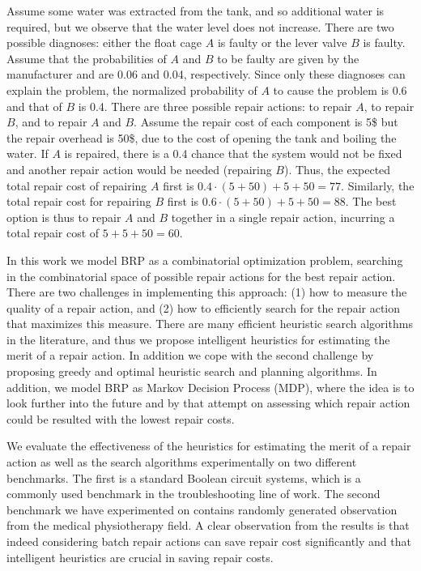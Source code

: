 \documentclass[a4paper,11pt]{report}
\newcommand\roni[1]{\textcolor{green}{roni: #1}}
\begin{document}
Assume some water was extracted from the tank, and so additional water is required, but we observe that the water level does not increase. There are two possible diagnoses: either the float cage $A$ is faulty or the lever valve $B$ is faulty. Assume that the probabilities of $A$ and $B$ to be faulty are given by the manufacturer and are 0.06 and 0.04, respectively. Since only these diagnoses can explain the problem, the normalized probability of $A$ to cause the problem is 0.6 and that of $B$ is 0.4. There are three possible repair actions: to repair $A$, to repair $B$, and to repair $A$ and $B$. Assume the repair cost of each component is 5\$ but the repair overhead is 50\$, due to the cost of opening the tank and boiling the water. If $A$ is repaired, there is a 0.4 chance that the system would not be fixed and another repair action would be needed (repairing $B$). Thus, the expected total repair cost of repairing $A$ first is $0.4\cdot(5+50)+5+50=77$. Similarly, the total repair cost for repairing $B$ first is $0.6\cdot(5+50)+5+50=88$. The best option is thus to repair $A$ and $B$ together in a single repair action, incurring a total repair cost of $5+5+50=60$.


In this work we model BRP as a combinatorial optimization problem, searching in the combinatorial space of possible repair actions for the best repair action. There are two challenges in implementing this approach: (1) how to measure the quality of a repair action, and (2) how to efficiently search for the repair action that maximizes this measure. There are many efficient heuristic search algorithms in the literature, and thus we propose intelligent heuristics for estimating the merit of a repair action. In addition we cope with the second challenge by proposing greedy and optimal heuristic search and planning algorithms.
In addition, we model BRP as Markov Decision Process (MDP), where the idea is to look further into the future and by that attempt on assessing which repair action could be resulted with the lowest repair costs. 

We evaluate the effectiveness of the heuristics for estimating the merit of a repair action as well as the search algorithms experimentally on two different benchmarks. The first is a standard Boolean circuit systems, which is a commonly used benchmark in the troubleshooting line of work. The second benchmark we have experimented on contains randomly generated observation from the medical physiotherapy field.
A clear observation from the results is that indeed considering batch repair actions can save repair cost significantly and that intelligent heuristics are crucial in saving repair costs. 
\end{document}
